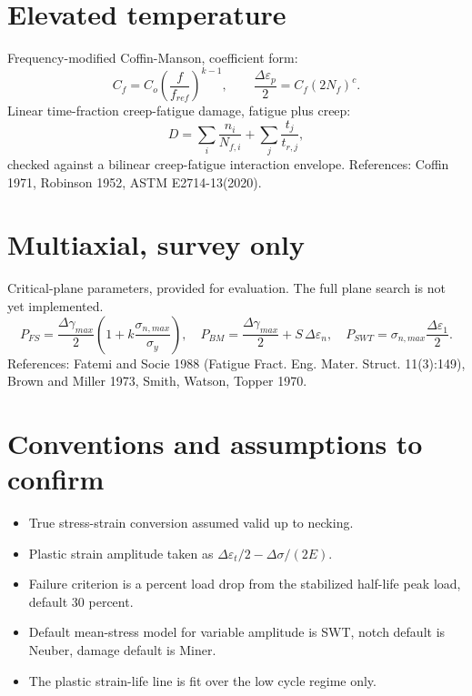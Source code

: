 \documentclass[11pt]{article}
\begin{document}
\section{Elevated temperature}
Frequency-modified Coffin-Manson, coefficient form:
\begin{equation}
C_f = C_o\left(\frac{f}{f_{ref}}\right)^{k-1},
\qquad
\frac{\Delta\varepsilon_p}{2} = C_f (2N_f)^{c}.
\end{equation}
Linear time-fraction creep-fatigue damage, fatigue plus creep:
\begin{equation}
D = \sum_i \frac{n_i}{N_{f,i}} + \sum_j \frac{t_j}{t_{r,j}},
\end{equation}
checked against a bilinear creep-fatigue interaction envelope. References: Coffin
1971, Robinson 1952, ASTM E2714-13(2020).

\section{Multiaxial, survey only}
Critical-plane parameters, provided for evaluation. The full plane search is not
yet implemented.
\begin{equation}
P_{FS} = \frac{\Delta\gamma_{max}}{2}\left(1 + k\frac{\sigma_{n,max}}{\sigma_y}\right),
\quad
P_{BM} = \frac{\Delta\gamma_{max}}{2} + S\,\Delta\varepsilon_n,
\quad
P_{SWT} = \sigma_{n,max}\frac{\Delta\varepsilon_1}{2}.
\end{equation}
References: Fatemi and Socie 1988 (Fatigue Fract. Eng. Mater. Struct. 11(3):149),
Brown and Miller 1973, Smith, Watson, Topper 1970.

\section{Conventions and assumptions to confirm}
\begin{itemize}[nosep]
\item True stress-strain conversion assumed valid up to necking.
\item Plastic strain amplitude taken as \(\Delta\varepsilon_t/2 - \Delta\sigma/(2E)\).
\item Failure criterion is a percent load drop from the stabilized half-life peak load, default 30 percent.
\item Default mean-stress model for variable amplitude is SWT, notch default is Neuber, damage default is Miner.
\item The plastic strain-life line is fit over the low cycle regime only.
\end{itemize}
\end{document}

